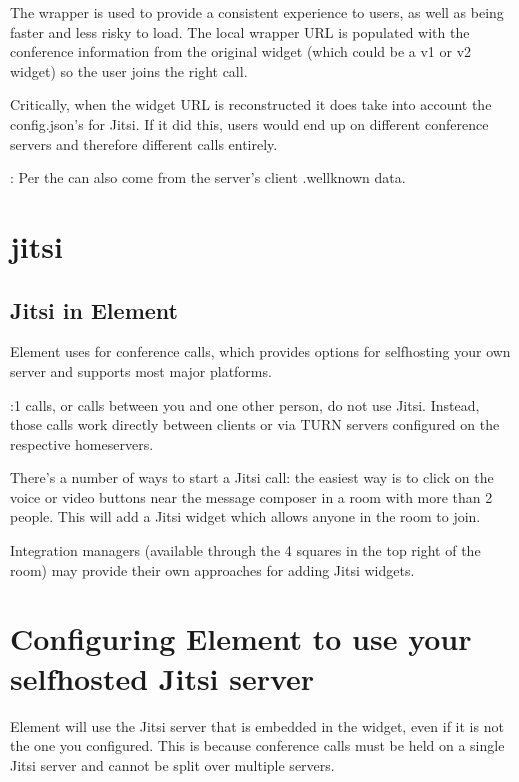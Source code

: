 \documentclass[letterpaper,10pt,openany,oneside,english]{sphinxmanual}
\begin{document}
\sphinxAtStartPar
The wrapper is used to provide a consistent experience to users, as well as being faster
and less risky to load. The local wrapper URL is populated with the conference information
from the original widget (which could be a v1 or v2 widget) so the user joins the right
call.

\sphinxAtStartPar
Critically, when the widget URL is reconstructed it does  take into account the
config.json’s  for Jitsi. If it did this, users would end up on different
conference servers and therefore different calls entirely.

\sphinxAtStartPar
{}: Per  the  can also come from the server’s
client .well\sphinxhyphen{}known data.


\chapter{jitsi}
\label{\detokenize{jitsi:jitsi}}\label{\detokenize{jitsi::doc}}

\section{Jitsi in Element}
\label{\detokenize{jitsi:jitsi-in-element}}
\sphinxAtStartPar
Element uses  for conference calls, which provides options for
self\sphinxhyphen{}hosting your own server and supports most major platforms.

:1 calls, or calls between you and one other person, do not use Jitsi. Instead, those
calls work directly between clients or via TURN servers configured on the respective
homeservers.

\sphinxAtStartPar
There’s a number of ways to start a Jitsi call: the easiest way is to click on the
voice or video buttons near the message composer in a room with more than 2 people. This
will add a Jitsi widget which allows anyone in the room to join.

\sphinxAtStartPar
Integration managers (available through the 4 squares in the top right of the room) may
provide their own approaches for adding Jitsi widgets.


\chapter{Configuring Element to use your self\sphinxhyphen{}hosted Jitsi server}
\label{\detokenize{jitsi:configuring-element-to-use-your-self-hosted-jitsi-server}}
\sphinxAtStartPar
Element will use the Jitsi server that is embedded in the widget, even if it is not the
one you configured. This is because conference calls must be held on a single Jitsi
server and cannot be split over multiple servers.
\end{document}
